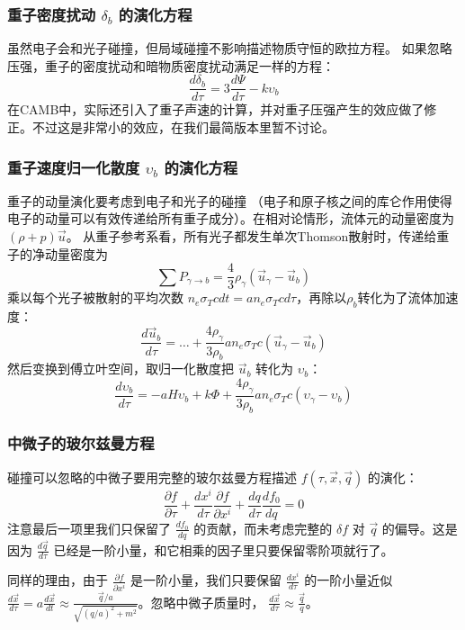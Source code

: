 \documentclass[CJK,13pt]{beamer}
\begin{document}
    \begin{frame}
      \frametitle{重子密度扰动 $\delta_b$ 的演化方程}
      虽然电子会和光子碰撞，但局域碰撞不影响描述物质守恒的欧拉方程。 如果忽略压强，重子的密度扰动和暗物质密度扰动满足一样的方程：
      {\blue      $$ \frac{d\delta_b}{d\tau} = 3\frac{d\Psi}{d\tau} - k\upsilon_b $$}
      在CAMB中，实际还引入了重子声速的计算，并对重子压强产生的效应做了修正。不过这是非常小的效应，在我们最简版本里暂不讨论。
    \end{frame}
    

    
    \begin{frame}
      \frametitle{重子速度归一化散度 $\upsilon_b$ 的演化方程}
      重子的动量演化要考虑到电子和光子的碰撞 （电子和原子核之间的库仑作用使得电子的动量可以有效传递给所有重子成分）。在相对论情形，流体元的动量密度为 $(\rho+p)\vec{u}$。 从重子参考系看，所有光子都发生单次Thomson散射时，传递给重子的净动量密度为
      $$\sum P_{\gamma\rightarrow b} = \frac{4}{3}\rho_{\gamma}\left(\vec{u}_\gamma-\vec{u}_b\right)$$     
      乘以每个光子被散射的平均次数 $n_e\sigma_Tcdt = an_e\sigma_T c d\tau$，再除以$\rho_b$转化为了流体加速度：
      $$\frac{d\vec{u}_b}{d\tau} = \ldots + \frac{4\rho_{\gamma}}{3\rho_b}an_e\sigma_Tc\left(\vec{u}_\gamma-\vec{u}_b\right) $$
      然后变换到傅立叶空间，取归一化散度把 $\vec{u}_b$ 转化为 $\upsilon_b$：
      {\blue $$ \frac{d\upsilon_b}{d\tau} = -aH\upsilon_b  + k \Phi + \frac{4\rho_{\gamma}}{3\rho_b} an_e\sigma_Tc \left(\upsilon_\gamma-\upsilon_b\right)$$}
    \end{frame}

    
    \begin{frame}
      \frametitle{中微子的玻尔兹曼方程}
      碰撞可以忽略的中微子要用完整的玻尔兹曼方程描述 $f(\tau, \vec{x}, \vec{q})$ 的演化：
      $$\frac{\partial f}{\partial \tau} + \frac{dx^i}{d\tau}\frac{\partial f}{\partial x^i} + \frac{d q}{d\tau} \frac{d f_0}{d q} = 0$$
      注意最后一项里我们只保留了 $\frac{d f_0}{d q}$ 的贡献，而未考虑完整的 $\delta f$ 对 $\vec{q}$ 的偏导。这是因为 $\frac{d\vec{q}}{d\tau}$ 已经是一阶小量，和它相乘的因子里只要保留零阶项就行了。

      同样的理由，由于 $\frac{\partial f}{\partial x^i}$ 是一阶小量，我们只要保留 $\frac{dx^i}{d\tau}$ 的一阶小量近似 $\frac{d\vec{x}}{d\tau} = a \frac{d\vec{x}}{dt} \approx \frac{\vec{q}/a}{\sqrt{(q/a)^2+m^2}}$。忽略中微子质量时， $\frac{d\vec{x}}{d\tau}\approx \frac{\vec{q}}{q}$。

    \end{frame}
\end{document}
